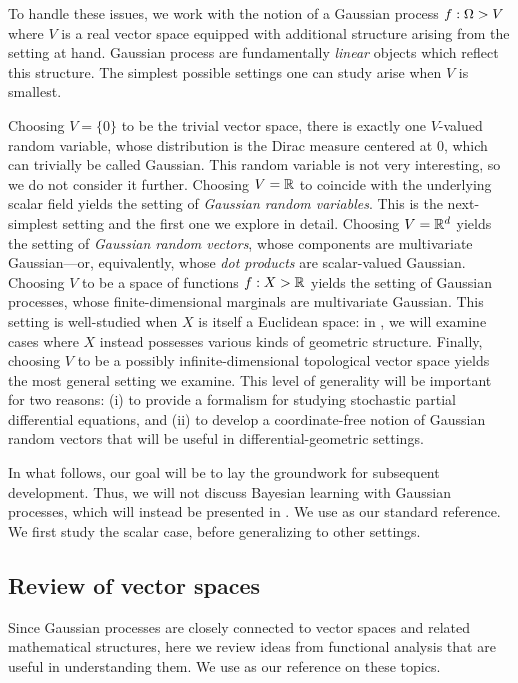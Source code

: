 \documentclass[11pt]{book}
\begin{document}
To handle these issues, we work with the notion of a Gaussian process $f : \Omega \-> V$ where $V$ is a real vector space equipped with additional structure arising from the setting at hand.
Gaussian process are fundamentally \emph{linear} objects which reflect this structure.
The simplest possible settings one can study arise when $V$ is smallest.

\1  Choosing $V = \{0\}$ to be the trivial vector space, there is exactly one $V$-valued random variable, whose distribution is the Dirac measure centered at $0$, which can trivially be called Gaussian.
This random variable is not very interesting, so we do not consider it further.
\2 Choosing $V = \mathbb{R}$ to coincide with the underlying scalar field yields the setting of \emph{Gaussian random variables}.
This is the next-simplest setting and the first one we explore in detail.
\3 Choosing $V = \mathbb{R}^d$ yields the setting of \emph{Gaussian random vectors}, whose components are multivariate Gaussian---or, equivalently, whose \emph{dot products} are scalar-valued Gaussian.
\4 Choosing $V$ to be a space of functions $f : X \-> \mathbb{R}$ yields the setting of Gaussian processes, whose finite-dimensional marginals are multivariate Gaussian.
This setting is well-studied when $X$ is itself a Euclidean space: in , we will examine cases where $X$ instead possesses various kinds of geometric structure.
\5 Finally, choosing $V$ to be a possibly infinite-dimensional topological vector space yields the most general setting we examine.
This level of generality will be important for two reasons: (i) to provide a formalism for studying stochastic partial differential equations, and (ii) to develop a coordinate-free notion of Gaussian random vectors that will be useful in differential-geometric settings.
\0 

In what follows, our goal will be to lay the groundwork for subsequent development.
Thus, we will not discuss Bayesian learning with Gaussian processes, which will instead be presented in .
We use \textcite{lifshits12} as our standard reference.
We first study the scalar case, before generalizing to other settings.

\subsection{Review of vector spaces}
Since Gaussian processes are closely connected to vector spaces and related mathematical structures, here we review ideas from functional analysis that are useful in understanding them.
We use \textcite{lang12} as our reference on these topics.
\end{document}
